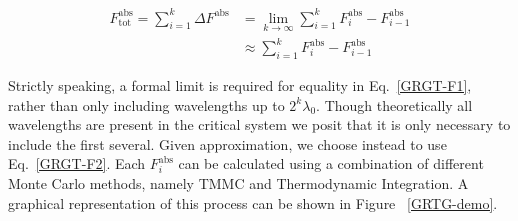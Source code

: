 \documentclass[12pt]{article}
\begin{document}
\begin{align}
    \label{GRGT-F1}
    F^{\text{abs}}_{\text{tot}} = \sum_{i=1}^{k}\Delta F^{\text{abs}} &= \lim_{k\to\infty}\sum_{i=1}^{k} F^{\text{abs}}_{i} - F^{\text{abs}}_{i-1}\\
    &\approx \sum_{i=1}^{k} F^{\text{abs}}_{i} - F^{\text{abs}}_{i-1}
    \label{GRGT-F2}
\end{align}

Strictly speaking, a formal limit is required for equality in Eq.~\ref{GRGT-F1}, rather than only including wavelengths up to $2^k\lambda_0$. Though theoretically all wavelengths are present in the critical system we posit that it is only necessary to include the first several. Given approximation, we choose instead to use Eq.~\ref{GRGT-F2}. Each $F^{\text{abs}}_i$ can be calculated using a combination of different Monte Carlo methods, namely TMMC and Thermodynamic Integration. A graphical representation of this process can be shown in Figure ~\ref{GRTG-demo}.\\

\end{document}
